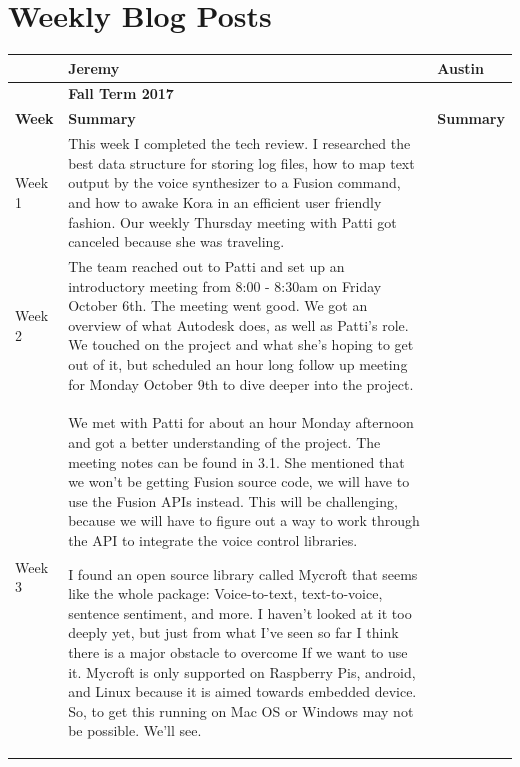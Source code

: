 \documentclass[onecolumn, draftclsnofoot,10pt, compsoc]{IEEEtran}
\begin{document}
\section{Weekly Blog Posts}
	\begin{center}
		\begin{longtabu} to \textwidth {|X[2,l]|X[8,l]|X[8,l]|}
			\hline
			& \textbf{\Large{Jeremy}} & \textbf{\Large{Austin}}  \\ \hline
			&	\textbf{\large{Fall Term 2017}}  &\\ \hline
			\textbf{Week} & \textbf{Summary}  & \textbf{Summary }\\ \hline
			
			Week 1 
			& 
			{
				This week I completed the tech review. I researched the best data structure for storing log files, how to map text output by the voice synthesizer to a Fusion command, and how to awake Kora in an efficient user friendly fashion.
				Our weekly Thursday meeting with Patti got canceled because she was traveling.
			}
			
			&
			\\ \hline
			
			Week 2 
			&  
			{
				The team reached out to Patti and set up an introductory meeting from 8:00 - 8:30am on Friday October 6th. The meeting went good. We got an overview of what Autodesk does, as well as Patti's role. We touched on the project and what she's hoping to get out of it, but scheduled an hour long follow up meeting for Monday October 9th to dive deeper into the project. 
			}
			
			&
			\\ \hline
			
			Week 3 
			&
			{
				We met with Patti for about an hour Monday afternoon and got a better understanding of the project. The meeting notes can be found in 3.1. She mentioned that we won't be getting Fusion source code, we will have to use the Fusion APIs instead. This will be challenging, because we will have to figure out a way to work through the API to integrate the voice control libraries.
				
				I found an open source library called Mycroft that seems like the whole package: Voice-to-text, text-to-voice, sentence sentiment, and more. I haven't looked at it too deeply yet, but just from what I've seen so far I think there is a major obstacle to overcome If we want to use it. Mycroft is only supported on Raspberry Pis, android, and Linux because it is aimed towards embedded device. So, to get this running on Mac OS or Windows may not be possible. We'll see.
			}
			 

\end{longtabu}
\end{center}
\end{document}
